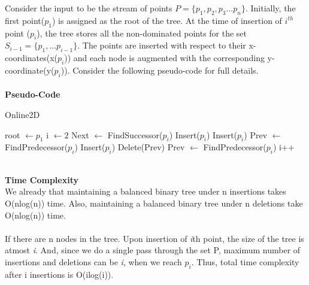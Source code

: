 \documentclass{article}
\begin{document}
Consider the input to be the stream of points $P = \{p_1,p_2,p_3 ... p_n\}$. Initially, the first point($p_1$) is assigned as the root of the tree. At the time of insertion of \emph{$i^{th}$} point ($p_i$), the tree stores all the non-dominated points for the set $S_{i-1} = \{p_1,...p_{i-1} \}$. The points are inserted with respect to their x-coordinates(x($p_i$)) and each node is augmented with the corresponding y-coordinate(y($p_i$)). Consider the following pseudo-code for full details.\\ \\
\textbf{Pseudo-Code}
\begin{algorithm}
\caption{Online2D}
\label{online}
\begin{algorithmic}[1]
\State root $\gets p_1$  
\State i $\gets 2$
\State Next $\gets$ FindSuccessor($p_i$) 
\State Insert($p_i$)
  
\State Insert($p_i$) 
\State Prev $\gets$ FindPredecessor($p_i$)  
\State Insert($p_i$)
\Else
{}   
\State Delete(Prev)   
\State Prev $\gets$ FindPredecessor($p_i$)
\EndWhile
\EndIf
\EndIf
\State i++
\EndWhile
\EndProcedure
\end{algorithmic}
\end{algorithm}
\\
\textbf{Time Complexity}\\
We already that maintaining a balanced binary tree under n insertions takes O(nlog(n)) time. Also, maintaining a balanced binary tree under n deletions take O(nlog(n)) time.\\ \\
If there are n nodes in the tree. Upon insertion of \emph{i}th point, the size of the tree is atmost \emph{i}. And, since we do a single pass through the set P, maximum number of insertions and deletions can be \emph{i}, when we reach $p_i$. Thus, total time complexity after i insertions is O(ilog(i)).
\end{document}
